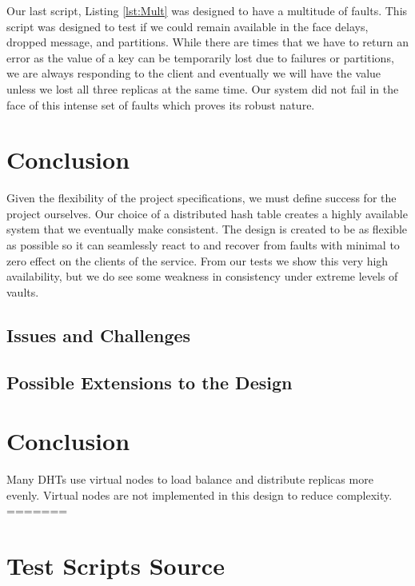\documentclass[11pt]{article}
\begin{document}
Our last script, Listing \ref{lst:Mult} was designed to have a multitude of faults. This script was designed to test if we could remain available in the face delays, dropped message, and partitions. While there are times that we have to return an error as the value of a key can be temporarily lost due to failures or partitions, we are always responding to the client and eventually we will have the value unless we lost all three replicas at the same time. Our system did not fail in the face of this intense set of faults which proves its robust nature.

\section{Conclusion}\label{sec:Conc}

Given the flexibility of the project specifications, we must define success for the project ourselves. Our choice of a distributed hash table creates a highly available system that we eventually make consistent. The design is created to be as flexible as possible so it can seamlessly react to and recover from faults with minimal to zero effect on the clients of the service. From our tests we show this very high availability, but we do see some weakness in consistency under extreme levels of vaults.

\subsection{Issues and Challenges}

\subsection{Possible Extensions to the Design}

\section{Conclusion}\label{sec:Conc}
Many DHTs use virtual nodes to load balance and distribute replicas more evenly. Virtual nodes are not implemented in this design to reduce complexity.
=======

\clearpage

\printbibliography

\clearpage

\appendix

\section{Test Scripts Source}
\end{document}

